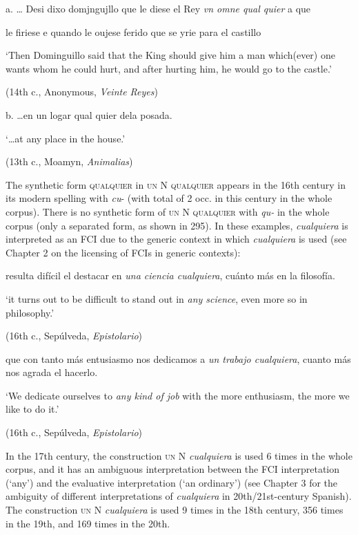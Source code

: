 \documentclass[output=paper]{langscibook}
\begin{document}
  a.  … Desi dixo domjngujllo que le diese el Rey \textit{vn omne qual quier} a que

le firiese e quando le oujese ferido que se yrie para el castillo 

    ‘Then Dominguillo said that the King should give him a man which(ever) one wants whom he could hurt, and after hurting him, he would go to the castle.’

    (14th c., Anonymous, \textit{Veinte Reyes})

  b.  …en un logar qual quier dela posada. 

    ‘…at any place in the house.’

    (13th c., Moamyn, \textit{Animalias})

The synthetic form \textsc{qualquier} in \textsc{un} N \textsc{qualquier} appears in the 16th century in its modern spelling with \textit{cu}{}- (with total of 2 occ. in this century in the whole corpus). There is no synthetic form of \textsc{un} N \textsc{qualquier} with \textit{qu-} in the whole corpus (only a separated form, as shown in 295). In these examples, \textit{cualquiera} is interpreted as an FCI due to the generic context in which \textit{cualquiera} is used (see Chapter 2 on the licensing of FCIs in generic contexts):

  resulta difícil el destacar en \textit{una ciencia cualquiera}, cuánto más en la filosofía. 

  ‘it turns out to be difficult to stand out in \textit{any science}, even more so in philosophy.’

  (16th c., Sepúlveda, \textit{Epistolario})

  que con tanto más entusiasmo nos dedicamos a \textit{un trabajo cualquiera}, cuanto más nos agrada el hacerlo. 

  ‘We dedicate ourselves to \textit{any kind of job} with the more enthusiasm, the more we like to do it.’

  (16th c., Sepúlveda, \textit{Epistolario})

In the 17th century, the construction \textsc{un} N \textit{cualquiera} is used 6 times in the whole corpus, and it has an ambiguous interpretation between the FCI interpretation (‘any’) and the evaluative interpretation (‘an ordinary’) (see Chapter 3 for the ambiguity of different interpretations of \textit{cualquiera} in 20th/21st-century Spanish). The construction \textsc{un} N \textit{cualquiera} is used 9 times in the 18th century, 356 times in the 19th, and 169 times in the 20th.
\end{document}
